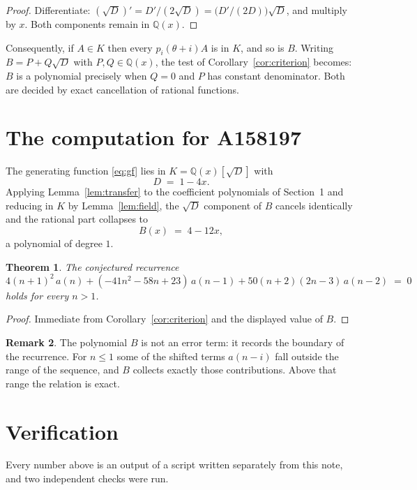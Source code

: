 \documentclass[11pt,a4paper]{article}
\theoremstyle{plain}
\newtheorem{theorem}{Theorem}
\theoremstyle{definition}
\newtheorem{remark}[theorem]{Remark}
\begin{document}
\begin{proof}
Differentiate: $(\sqrt{D})'=D'/(2\sqrt{D})=\bigl(D'/(2D)\bigr)\sqrt{D}$, and multiply by
$x$. Both components remain in $\mathbb{Q}(x)$.
\end{proof}

Consequently, if $A\in K$ then every $p_{i}(\theta+i)A$ is in $K$, and so is $B$. Writing
$B=P+Q\sqrt{D}$ with $P,Q\in\mathbb{Q}(x)$, the test of Corollary~\ref{cor:criterion}
becomes: $B$ is a polynomial precisely when $Q=0$ and $P$ has constant denominator. Both
are decided by exact cancellation of rational functions.

\section{The computation for A158197}

The generating function \eqref{eq:gf} lies in $K=\mathbb{Q}(x)[\sqrt{D}]$ with
\[
D \;=\; 1 - 4 x .
\]
Applying Lemma~\ref{lem:transfer} to the coefficient polynomials of Section~1 and reducing
in $K$ by Lemma~\ref{lem:field}, the $\sqrt{D}$ component of $B$ cancels identically and
the rational part collapses to
\[
B(x)\;=\;4 - 12 x ,
\]
a polynomial of degree $1$.

\begin{theorem}
The conjectured recurrence
\[
4 \left(n + 1\right)^{2}\,a(n) + (- 41 n^{2} - 58 n + 23)\,a(n-1) + 50 \left(n + 2\right) \left(2 n - 3\right)\,a(n-2) \;=\;0
\]
holds for every $n>1$.
\end{theorem}

\begin{proof}
Immediate from Corollary~\ref{cor:criterion} and the displayed value of $B$.
\end{proof}

\begin{remark}
The polynomial $B$ is not an error term: it records the boundary of the recurrence. For
$n\le1$ some of the shifted terms $a(n-i)$ fall outside the range of the sequence,
and $B$ collects exactly those contributions. Above that range the relation is exact.
\end{remark}

\section{Verification}

Every number above is an output of a script written separately from this note, and two
independent checks were run.
\end{document}
